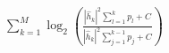 \documentclass[preview]{standalone}
\begin{document}
\begin{align*}
\sum_{k=1}^{M} \log_2 \left(\frac{\left|{\hat{h}_k}\right|^2\sum_{l=1}^{k}p_l+ C}{\left|{\hat{h}_k}\right|^2\sum_{j=1}^{k-1}p_j+ C}\right)
\end{align*}
\end{document}
